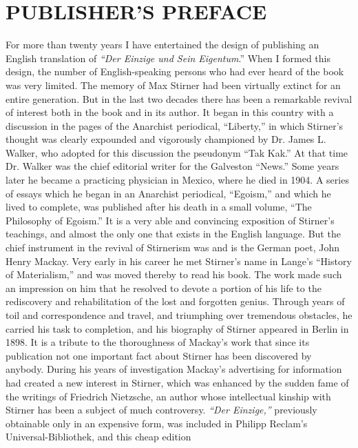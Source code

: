 \chapter[Publisher's Preface]{\centering PUBLISHER'S PREFACE}

For more than twenty years I have entertained the design of publishing an 
English translation of \textit{``Der Einzige und Sein Eigentum}.'' When I 
formed this design, the number of English-speaking persons who had ever heard 
of the book was very limited. The memory of Max Stirner had been virtually 
extinct for an entire generation. But in the last two decades there has been a 
remarkable revival of interest both in the book and in its author. It began in 
this country with a discussion in the pages of the Anarchist periodical, 
``Liberty,'' in which Stirner's thought was clearly expounded and vigorously 
championed by Dr. James L. Walker, who adopted for this discussion the 
pseudonym ``Tak Kak.'' At that time Dr. Walker was the chief editorial 
writer for the Galveston ``News.'' Some years later he became a practicing 
physician in Mexico, where he died in 1904. A series of essays which he began 
in an Anarchist periodical, ``Egoism,'' and which he lived to complete, was 
published after his death in a small volume, ``The Philosophy of Egoism.'' 
It is a very able and convincing exposition of Stirner's teachings, and almost 
the only one that exists in the English language. But the chief instrument in 
the revival of Stirnerism was and is the German poet, John Henry Mackay. Very 
early in his career he met Stirner's name in Lange's ``History of 
Materialism,'' and was moved thereby to read his book. The work made such an 
impression on him that he resolved to devote a portion of his life to the 
rediscovery and rehabilitation of the lost and forgotten genius. Through years 
of toil and correspondence and travel, and triumphing over tremendous 
obstacles, he carried his task to completion, and his biography of Stirner 
appeared in Berlin in 1898. It is a tribute to the thoroughness of Mackay's 
work that since its publication not one important fact about Stirner has been 
discovered by anybody. During his years of investigation Mackay's advertising 
for information had created a new interest in Stirner, which was enhanced by 
the sudden fame of the writings of Friedrich Nietzsche, an author whose 
intellectual kinship with Stirner has been a subject of much controversy. 
\textit{``Der Einzige,''} previously obtainable only in an expensive form, 
was included in Philipp Reclam's Universal-Bibliothek, and this cheap edition 
